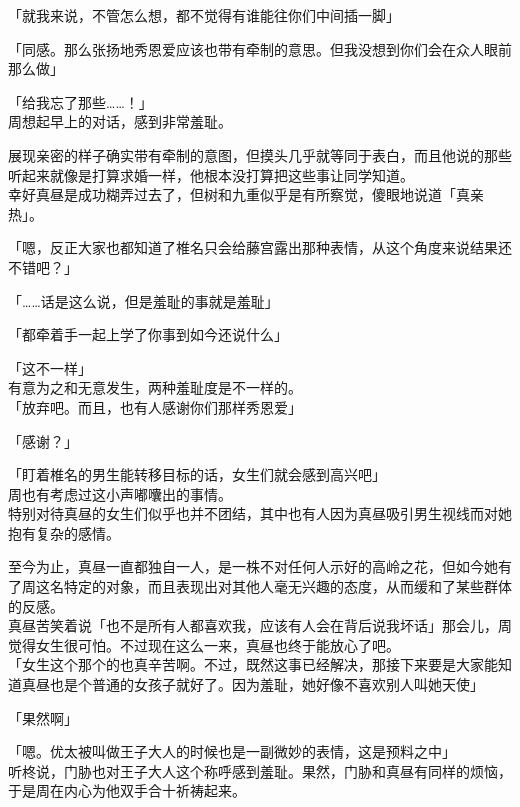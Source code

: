 「就我来说，不管怎么想，都不觉得有谁能往你们中间插一脚」

「同感。那么张扬地秀恩爱应该也带有牵制的意思。但我没想到你们会在众人眼前那么做」

「给我忘了那些……！」\\

周想起早上的对话，感到非常羞耻。

展现亲密的样子确实带有牵制的意图，但摸头几乎就等同于表白，而且他说的那些听起来就像是打算求婚一样，他根本没打算把这些事让同学知道。\\

幸好真昼是成功糊弄过去了，但树和九重似乎是有所察觉，傻眼地说道「真亲热」。

「嗯，反正大家也都知道了椎名只会给藤宫露出那种表情，从这个角度来说结果还不错吧？」

「……话是这么说，但是羞耻的事就是羞耻」

「都牵着手一起上学了你事到如今还说什么」

「这不一样」\\

有意为之和无意发生，两种羞耻度是不一样的。\\

「放弃吧。而且，也有人感谢你们那样秀恩爱」

「感谢？」

「盯着椎名的男生能转移目标的话，女生们就会感到高兴吧」\\

周也有考虑过这小声嘟囔出的事情。\\

特别对待真昼的女生们似乎也并不团结，其中也有人因为真昼吸引男生视线而对她抱有复杂的感情。

至今为止，真昼一直都独自一人，是一株不对任何人示好的高岭之花，但如今她有了周这名特定的对象，而且表现出对其他人毫无兴趣的态度，从而缓和了某些群体的反感。\\

真昼苦笑着说「也不是所有人都喜欢我，应该有人会在背后说我坏话」那会儿，周觉得女生很可怕。不过现在这么一来，真昼也终于能放心了吧。\\

「女生这个那个的也真辛苦啊。不过，既然这事已经解决，那接下来要是大家能知道真昼也是个普通的女孩子就好了。因为羞耻，她好像不喜欢别人叫她天使」

「果然啊」

「嗯。优太被叫做王子大人的时候也是一副微妙的表情，这是预料之中」\\

听柊说，门胁也对王子大人这个称呼感到羞耻。果然，门胁和真昼有同样的烦恼，于是周在内心为他双手合十祈祷起来。\\

